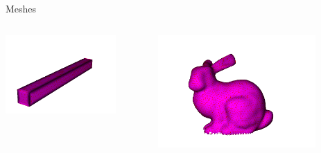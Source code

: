\documentclass[9pt]{beamer}
\begin{document}
\begin{frame}{Meshes}
    \begin{columns}[T]
        \begin{column}{0.5\textwidth}
            \centering
            \includegraphics[width=0.8\textwidth]{Images/beam.png}
        \end{column}
        \begin{column}{0.5\textwidth}
            \centering
            \includegraphics[width=0.8\textwidth]{Images/stanford_bunny.png}
        \end{column}
    \end{columns}
\end{frame}
\end{document}
